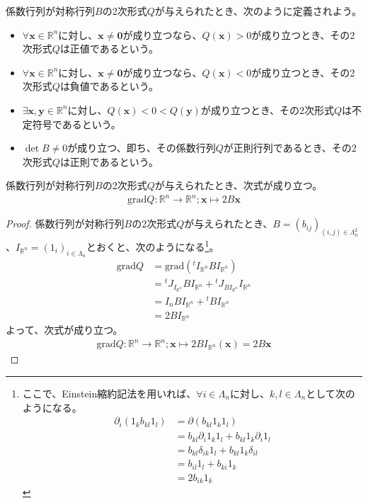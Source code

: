 \documentclass[dvipdfmx]{jsarticle}
\begin{document}
\begin{dfn}
係数行列が対称行列$B$の2次形式$Q$が与えられたとき、次のように定義されよう。
\begin{itemize}
\item
  $\forall\mathbf{x} \in \mathbb{R}^{n}$に対し、$\mathbf{x} \neq \mathbf{0}$が成り立つなら、$Q\left( \mathbf{x} \right) > 0$が成り立つとき、その2次形式$Q$は正値であるという。
\item
  $\forall\mathbf{x} \in \mathbb{R}^{n}$に対し、$\mathbf{x} \neq \mathbf{0}$が成り立つなら、$Q\left( \mathbf{x} \right) < 0$が成り立つとき、その2次形式$Q$は負値であるという。
\item
  $\exists\mathbf{x},\mathbf{y} \in \mathbb{R}^{n}$に対し、$Q\left( \mathbf{x} \right) < 0 < Q\left( \mathbf{y} \right)$が成り立つとき、その2次形式$Q$は不定符号であるという。
\item
  $\det B \neq 0$が成り立つ、即ち、その係数行列$Q$が正則行列であるとき、その2次形式$Q$は正則であるという。
\end{itemize}
\end{dfn}
\begin{thm}\label{4.4.3.4}
係数行列が対称行列$B$の2次形式$Q$が与えられたとき、次式が成り立つ。
\begin{align*}
\mathrm{grad}Q:\mathbb{R}^{n} \rightarrow \mathbb{R}^{n};\mathbf{x} \mapsto 2B\mathbf{x} 
\end{align*}
\end{thm}
\begin{proof}
係数行列が対称行列$B$の2次形式$Q$が与えられたとき、$B = \left( b_{ij} \right)_{(i,j) \in \varLambda_{n}^2 }$、$I_{\mathbb{R}^n } = \left( 1_i \right)_{i\in \varLambda_{n}}$とおくと、次のようになる\footnote{ここで、Einstein縮約記法を用いれば、$\forall i\in \varLambda_n $に対し、$k,l\in \varLambda_n $として次のようになる。
\begin{align*}
\partial_i \left(1_kb_{kl}1_l\right) &= \partial\left(b_{kl}1_k1_l\right) \\
&= b_{kl}\partial_i1_k1_l+b_{kl}1_k\partial_i1_l \\
&= b_{kl}\delta_{ik}1_l+b_{kl}1_k\delta_{il} \\
&= b_{il}1_l+b_{ki}1_k \\
&= 2b_{ik}1_k
\end{align*}}。
\begin{align*}
\mathrm{grad}Q &= \mathrm{grad} \left( {}^tI_{\mathbb{R}^n}BI_{\mathbb{R}^n}\right) \\
&= {}^t J_{I_{\mathbb{R}^n}} BI_{\mathbb{R}^n} +{}^t J_{BI_{\mathbb{R}^n}} I_{\mathbb{R}^n} \\
&= I_n BI_{\mathbb{R}^n} +{}^t BI_{\mathbb{R}^n} \\
&= 2BI_{\mathbb{R}^n} 
\end{align*}
よって、次式が成り立つ。
\begin{align*}
\mathrm{grad}Q:\mathbb{R}^{n} \rightarrow \mathbb{R}^{n};\mathbf{x} \mapsto 2BI_{\mathbb{R}^n} \left(\mathbf{x}\right)=2B\mathbf{x} 
\end{align*}
\end{proof}
\end{document}
